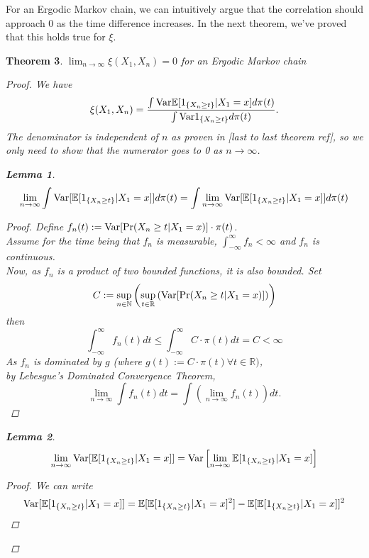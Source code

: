 \documentclass{article}
\newtheorem{theorem}{Theorem}[section]
\newtheorem{lemma}[theorem]{Lemma}
\begin{document}
	For an Ergodic Markov chain, we can intuitively argue that the correlation should approach $0$ as the time difference increases.
	In the next theorem, we've proved that this holds true for $\xi$.
	\begin{theorem}
		$\lim_{n \rightarrow \infty} \xi(X_1, X_{n}) = 0$ for an Ergodic Markov chain
		\begin{proof}
			We have
			\begin{equation*}
				\xi(X_1, X_{n}) = \frac{\int \text{Var}{\mathbb{E}[1_{\{X_{n} \geq t\}}|X_1=x]} d\pi(t)}{\int \text{Var}{1_{\{X_{n} \geq t\}}} d\pi(t)}.
			\end{equation*}
			The denominator is independent of $n$ as proven in [last to last theorem ref], so we only need to show that the numerator goes to 0 as $n \rightarrow \infty$.\\
			\begin{lemma}
				$$\lim_{n \rightarrow \infty} \int \text{Var}[\mathbb{E}[1_{\{X_{n} \geq t\}}|X_1=x]] d\pi(t) = \int \lim_{n \rightarrow \infty}\text{Var}[\mathbb{E}[1_{\{X_{n} \geq t\}}|X_1=x]] d\pi(t)$$
				\begin{proof}
					Define $f_n(t) := \text{Var}[\Pr(X_{n} \geq t | X_{1} = x)] \cdot \pi(t)$. \\
					Assume for the time being that $f_n$ is measurable, $\int_{-\infty}^{\infty} f_n < \infty$ and $f_n$ is continuous.\\
					Now, as $f_n$ is a product of two bounded functions, it is also bounded.
					Set
					$$ C:= \sup_{n \in \mathbb{N}} \left(\sup_{t \in \mathbb{R}} \left(\text{Var}[\Pr(X_{n} \geq t | X_{1} = x)]\right)\right)$$
					then
					$$\int_{-\infty}^{\infty} f_n(t)dt \leq \int_{-\infty}^{\infty} C\cdot\pi(t)dt = C < \infty$$
					As $f_n$ is dominated by $g$ (where $g(t) := C\cdot\pi(t) \forall t \in \mathbb{R})$, \\
					by Lebesgue's Dominated Convergence Theorem,
					$$\lim_{n \rightarrow \infty} \int f_n(t) dt = \int \left(\lim_{n \rightarrow \infty} f_n(t)\right) dt.$$
				\end{proof}
			\end{lemma}
			\begin{lemma}
				$$\lim_{n \rightarrow \infty} \text{Var}[\mathbb{E}[1_{\{X_{n} \geq t\}}|X_1=x]] = \text{Var}\left[\lim_{n \rightarrow \infty} \mathbb{E}[1_{\{X_{n} \geq t\}}|X_1=x]\right]$$
				\begin{proof}
					We can write
					\begin{align*}
						\Var[\mathbb{E}[1_{\{X_{n} \geq t\}}|X_1=x]] &= \mathbb{E}[\mathbb{E}[1_{\{X_{n} \geq t\}}|X_1=x]^2] - \mathbb{E}[\mathbb{E}[1_{\{X_{n} \geq t\}}|X_1=x]]^2 \\

\end{align*}
\end{proof}
\end{lemma}
\end{proof}
\end{theorem}
\end{document}

